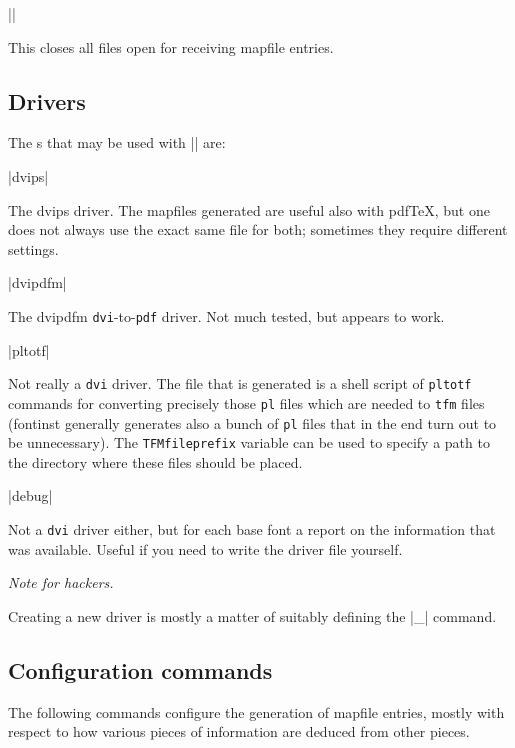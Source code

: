 \documentclass[a4paper]{ltxguide}
\newenvironment{hackernote}{%
   \list{}{
     \setlength{\leftmargin}{0pt}%
     \setlength\labelwidth{0pt}%
     \setlength{\listparindent}{1.4em}%
     \setlength{\parsep}{0pt plus 1pt}%
     \setlength{\itemsep}{\medskipamount}%
   }\item[]%
   \small
   \textit{Note for hackers.}\hspace{0.5em}%
}{\endlist}
\newcommand*{\meta}{\m}
\newcommand*{\setfilename}[1]{\texttt{#1}}
\newcommand*{\setpackagename}[1]{\textsf{#1}}
\newcommand{\dvips}   {\setpackagename{dvips}\xspace}
\newcommand{\fontinst}{\setpackagename{font\-inst}\xspace}
\newcommand{\pl} {\setfilename{pl}\xspace}
\newcommand{\tfm}{\setfilename{tfm}\xspace}
\newcommand{\dvi}{\setfilename{dvi}\xspace}
\newcommand{\pdf}{\setfilename{pdf}\xspace}
\begin{document}
\begin{decl}
  |\donedrivers|
\end{decl}
This closes all files open for receiving mapfile entries.


\subsection{Drivers}

The \meta{driver name}s that may be used with |\adddriver| are:

\begin{decl}
  |dvips|
\end{decl}
The \dvips driver. The mapfiles generated are useful also with 
pdf\TeX, but one does not always use the exact same file for both; 
sometimes they require different settings.

\begin{decl}
  |dvipdfm|
\end{decl}
The \setpackagename{dvipdfm} \dvi-to-\pdf driver. Not much tested, 
but appears to work.

\begin{decl}[v1.915]
  |pltotf|
\end{decl}
Not really a \dvi driver. The file that is generated is a shell 
script of \texttt{pltotf} commands for converting precisely those \pl 
files which are needed to \tfm files (\fontinst generally generates 
also a bunch of \pl files that in the end turn out to be 
unnecessary). The \texttt{TFMfileprefix} variable can be used to 
specify a path to the directory where these files should be placed.

\begin{decl}
  |debug|
\end{decl}
Not a \dvi driver either, but for each base font a report on the 
information that was available. Useful if you need to write the 
driver file yourself.

\begin{hackernote}
  Creating a new driver \meta{foo} is mostly a matter of suitably 
  defining the |\make_|\meta{foo} command.
\end{hackernote}


\subsection{Configuration commands}
\label{Ssec:MapConfig}

The following commands configure the generation of mapfile entries, 
mostly with respect to how various pieces of information are deduced 
from other pieces.
\end{document}
